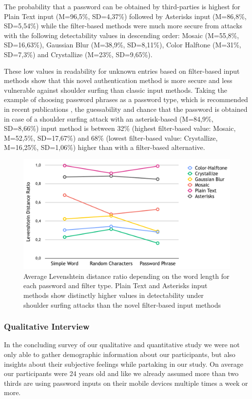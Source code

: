 \documentclass{sigchi}
\begin{document}
The probability that a password can be obtained by third-parties is highest for Plain Text input (M=96,5\%, SD=4,37\%) followed by Asterisks input (M=86,8\%, SD=5,54\%) while the filter-based methods were much more secure from attacks with the following detectability values in descending order: Mosaic (M=55,8\%, SD=16,63\%), Gaussian Blur (M=38,9\%, SD=8,11\%), Color Halftone (M=31\%, SD=7,3\%) and Crystallize (M=23\%, SD=9,65\%).

These low values in readability for unknown entries based on filter-based input methods show that this novel authentication method is more secure and less vulnerable against shoulder surfing than classic input methods. Taking the example of choosing password phrases as a password type, which is recommended in recent publications \cite{shay2014can}, the guessability and chance that the password is obtained in case of a shoulder surfing attack with an asterisk-based (M=84,9\%, SD=8,66\%) input method is between 32\% (highest filter-based value: Mosaic, M=52,5\%, SD=17,67\%) and 68\% (lowest filter-based value: Crystallize, M=16,25\%, SD=1,06\%) higher than with a filter-based alternative. 

\begin{figure}[h]
    \centering
    \includegraphics[width=\columnwidth]{figures/figure3.png}
    \caption{Average Levenshtein distance ratio depending on the word length for each password and filter type. Plain Text and Asterisks input methods show distinctly higher values in detectability under shoulder surfing attacks than the novel filter-based input methods
}
    \label{fig:levensthein}
    \vspace{-5mm}
\end{figure}

\subsubsection{Qualitative Interview}
In the concluding survey of our qualitative and quantitative study we were not only able to gather demographic information about our participants, but also insights about their subjective feelings while partaking in our study. On average our participants were 24 years old and like we already assumed more than two thirds are using password inputs on their mobile devices multiple times a week or more.
\end{document}
